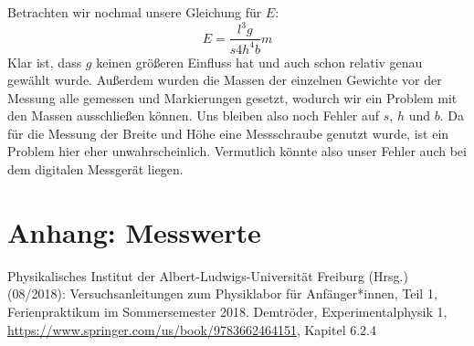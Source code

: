 \documentclass[11pt,a4paper]{article}
\begin{document}
Betrachten wir nochmal unsere Gleichung f\"ur $E$:
\[
E=\frac{l^3g}{s4h^4b}m
\]
Klar ist, dass $g$ keinen gr\"o\ss eren Einfluss hat und auch schon relativ genau gew\"ahlt wurde. Au\ss erdem wurden die Massen der einzelnen Gewichte vor der Messung alle gemessen und Markierungen gesetzt, wodurch wir ein Problem mit den Massen ausschlie\ss en k\"onnen. Uns bleiben also noch Fehler auf $s$, $h$ und $b$. Da f\"ur die Messung der Breite und H\"ohe eine Messschraube genutzt wurde, ist ein Problem hier eher unwahrscheinlich. Vermutlich k\"onnte also unser Fehler auch bei dem digitalen Messger\"at liegen.

\pagebreak

\section{Anhang: Messwerte}



\begin{thebibliography}{9}
 Physikalisches Institut der Albert-Ludwigs-Universität Freiburg (Hrsg.) (08/2018): Versuchsanleitungen zum Physiklabor für Anfänger*innen, Teil 1, Ferienpraktikum im Sommersemester 2018.
 Demtr\"oder, Experimentalphysik 1, \url{https://www.springer.com/us/book/9783662464151}, Kapitel 6.2.4
\end{thebibliography}
\end{document}
